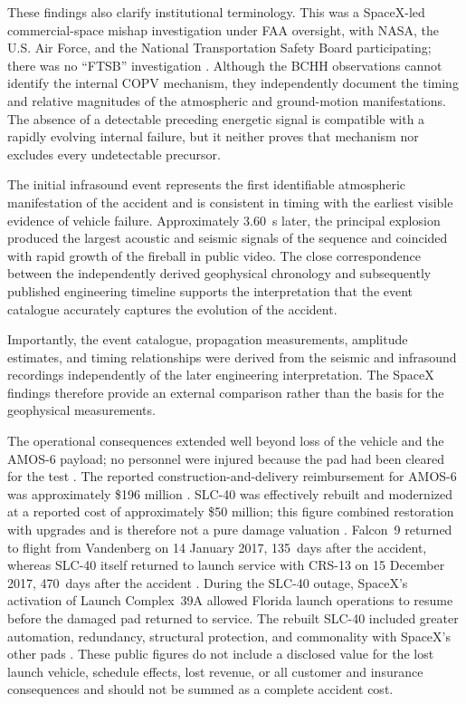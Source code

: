 \documentclass[]{seismica}
\begin{document}
These findings also clarify institutional terminology. This was a
SpaceX-led commercial-space mishap investigation under FAA oversight, with
NASA, the U.S. Air Force, and the National Transportation Safety Board
participating; there was no ``FTSB'' investigation
\citep{spacex_anomaly_2017}. Although the BCHH observations cannot identify the
internal COPV mechanism, they independently document the timing and relative
magnitudes of the atmospheric and ground-motion manifestations. The absence of
a detectable preceding energetic signal is compatible with a rapidly evolving
internal failure, but it neither proves that mechanism nor excludes every
undetectable precursor.

The initial infrasound event represents the first identifiable atmospheric
manifestation of the accident and is consistent in timing with the earliest
visible evidence of vehicle failure. Approximately 3.60~s later, the principal
explosion produced the largest acoustic and seismic signals of the sequence and
coincided with rapid growth of the fireball in public video. The close
correspondence between the independently derived geophysical chronology and
subsequently published engineering timeline supports the interpretation that
the event catalogue accurately captures the evolution of the accident.

Importantly, the event catalogue, propagation measurements, amplitude estimates, and timing relationships were derived from the seismic and infrasound recordings independently of the later engineering interpretation. The SpaceX findings therefore provide an external comparison rather than the basis for the geophysical measurements.

The operational consequences extended well beyond loss of the vehicle and the
AMOS-6 payload; no personnel were injured because the pad had been cleared for
the test \citep{harwood_explosion_2016}. The reported
construction-and-delivery reimbursement for AMOS-6 was
approximately \$196 million \citep{magan_amos6_2016}. SLC-40 was effectively
rebuilt and modernized at a reported
cost of approximately \$50 million; this figure combined restoration with
upgrades and is therefore not a pure damage valuation
\citep{clark_slc40_2017}. Falcon~9 returned to flight from Vandenberg on
14 January 2017, 135~days after the accident, whereas SLC-40 itself returned to
launch service with CRS-13 on 15 December 2017, 470~days after the accident
\citep{spacex_iridium1_2017,spacex_crs13_2017}. During the SLC-40 outage,
SpaceX's activation of Launch Complex~39A allowed Florida launch operations to
resume before the damaged pad returned to service. The rebuilt SLC-40 included
greater automation, redundancy, structural protection, and commonality with
SpaceX's other pads \citep{clark_slc40_2017}. These public figures do not
include a disclosed value for the lost launch vehicle, schedule effects, lost
revenue, or all customer and insurance consequences and should not be summed as
a complete accident cost.
\end{document}

